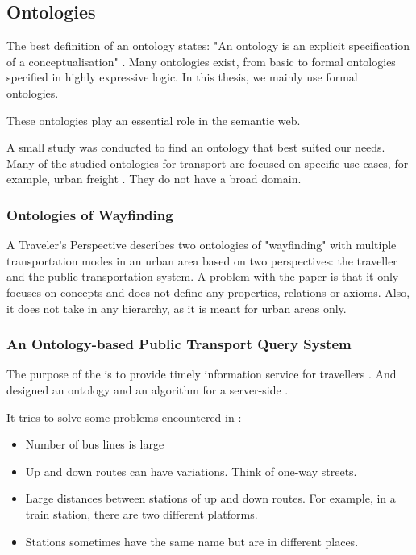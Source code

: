 \subsection{Ontologies}
The best definition of an ontology states: "An ontology is an explicit specification of a conceptualisation" \cite{gruber_translation_1993}. Many ontologies exist, from basic to formal ontologies specified in highly expressive logic. In this thesis, we mainly use formal ontologies.

These ontologies play an essential role in the semantic web. 

A small study was conducted to find an ontology that best suited our needs. Many of the studied ontologies for transport are focused on specific use cases, for example, urban freight \cite{bouhana_ontology-based_2015}. They do not have a broad domain. 

\subsubsection{Ontologies of Wayfinding}
A Traveler’s Perspective \cite{timpf_ontologies_2002} describes two ontologies of "wayfinding" with multiple transportation modes in an urban area based on two perspectives: the traveller and the public transportation system. A problem with the paper is that it only focuses on concepts and does not define any properties, relations or axioms. Also, it does not take in any hierarchy, as it is meant for urban areas only.

\subsubsection{An Ontology-based Public Transport Query System}
The purpose of the  is to provide timely information
service for travellers \cite{wang_ontology-based_2005}. And designed an ontology and an algorithm for a server-side .

It tries to solve some problems encountered in :\begin{itemize}
    \item Number of bus lines is large
    \item Up and down routes can have variations. Think of one-way streets.
    \item Large distances between stations of up and down routes. For example, in a train station, there are two different platforms.
    \item Stations sometimes have the same name but are in different places.
\end{itemize}

